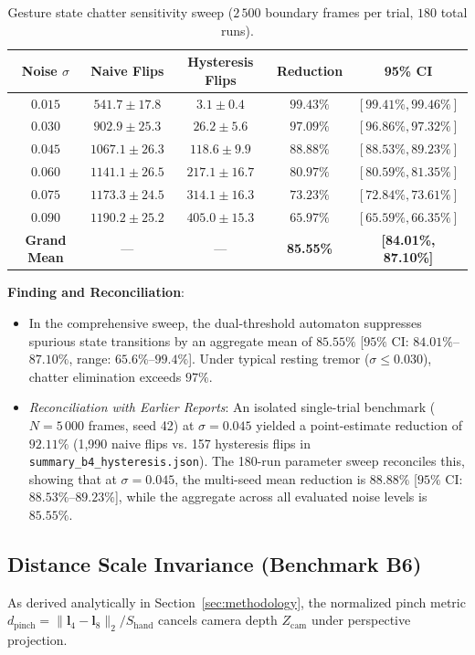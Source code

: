 \begin{table}[t]
\caption{Gesture state chatter sensitivity sweep ($2\,500$ boundary frames per trial, $180$ total runs).}
\label{tab:hysteresis_sweep}
\centering
\small
\begin{tabular}{ccccc}
\toprule
\textbf{Noise $\sigma$} & \textbf{Naive Flips} & \textbf{Hysteresis Flips} & \textbf{Reduction} & \textbf{95\% CI} \\
\midrule
$0.015$ & $541.7 \pm 17.8$ & $3.1 \pm 0.4$ & $99.43\%$ & $[99.41\%, 99.46\%]$ \\
$0.030$ & $902.9 \pm 25.3$ & $26.2 \pm 5.6$ & $97.09\%$ & $[96.86\%, 97.32\%]$ \\
$0.045$ & $1067.1 \pm 26.3$ & $118.6 \pm 9.9$ & $88.88\%$ & $[88.53\%, 89.23\%]$ \\
$0.060$ & $1141.1 \pm 26.5$ & $217.1 \pm 16.7$ & $80.97\%$ & $[80.59\%, 81.35\%]$ \\
$0.075$ & $1173.3 \pm 24.5$ & $314.1 \pm 16.3$ & $73.23\%$ & $[72.84\%, 73.61\%]$ \\
$0.090$ & $1190.2 \pm 25.2$ & $405.0 \pm 15.3$ & $65.97\%$ & $[65.59\%, 66.35\%]$ \\
\midrule
\textbf{Grand Mean} & — & — & \textbf{85.55\%} & \textbf{[84.01\%, 87.10\%]} \\
\bottomrule
\end{tabular}
\end{table}

\textbf{Finding and Reconciliation}: 
\begin{itemize}
    \item In the comprehensive sweep, the dual-threshold automaton suppresses spurious state transitions by an aggregate mean of $85.55\%$ [$95\%$ CI: $84.01\%$–$87.10\%$, range: $65.6\%$–$99.4\%$]. Under typical resting tremor ($\sigma \le 0.030$), chatter elimination exceeds $97\%$.
    \item \textit{Reconciliation with Earlier Reports}: An isolated single-trial benchmark ($N=5\,000$ frames, seed 42) at $\sigma=0.045$ yielded a point-estimate reduction of $92.11\%$ (1,990 naive flips vs. 157 hysteresis flips in \texttt{summary\_b4\_hysteresis.json}). The 180-run parameter sweep reconciles this, showing that at $\sigma=0.045$, the multi-seed mean reduction is $88.88\%$ [$95\%$ CI: $88.53\%$–$89.23\%$], while the aggregate across all evaluated noise levels is $85.55\%$.
\end{itemize}

\subsection{Distance Scale Invariance (Benchmark B6)}
As derived analytically in Section~\ref{sec:methodology}, the normalized pinch metric $d_{\text{pinch}} = \|\mathbf{l}_4 - \mathbf{l}_8\|_2 / S_{\text{hand}}$ cancels camera depth $Z_{\text{cam}}$ under perspective projection. 

